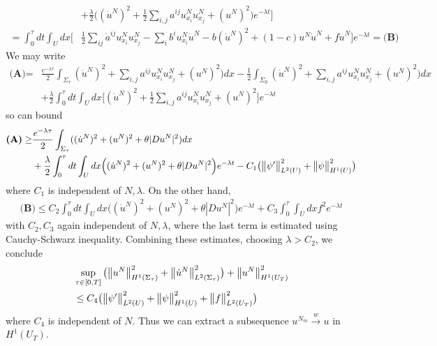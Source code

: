 \documentclass[12pt,a4paper]{report}
\newenvironment{proof}
{\begin{changemargin}{1cm}{0.5cm} 
	}%
	{\end{changemargin}
}
\begin{document}
\begin{proof}
\begin{align*}
&+ \frac{\lambda}{2} \Big( (\dot{u}^N)^2 + \frac{1}{2} \sum_{i,j}a^{ij}u^N_{x_i}u^N_{x_j} + (u^N)^2 \Big)e^{-\lambda t} \bigg] \\
= \int_0^{\tau}dt \int_U dx \Big[ &\frac{1}{2} \sum_{ij} \dot{a}^{ij} u_{x_i}^N u_{x_j}^N - \sum_i b^i u_{x_i}^N \dot{u}^N - b(\dot{u}^N)^2 + (1-c)u^N \dot{u}^N + f\dot{u}^N \Big]e^{-\lambda t} = \textbf{(B)}
\end{align*}
We may write
\begin{align*}
\textbf{(A)} =& \frac{e^{-\lambda \tau}}{2} \int_{\Sigma_{\tau}} ( \dot{u}^N)^2 + \sum_{i,j} a^{ij} u^N_{x_i} u^N_{x_j} +(u^N)^2 )dx - \frac{1}{2} \int_{\Sigma_{0}} ( \dot{u}^N)^2 + \sum_{i,j} a^{ij} u^N_{x_i} u^N_{x_j} +(u^N)^2 )dx \\
&+ \frac{\lambda}{2} \int_0^{\tau} dt \int_U dx \Big[ (\dot{u}^N)^2 + \frac{1}{2} \sum_{i,j}a^{ij}u_{x_i}^N u_{x_j}^N + (u^N)^2 \Big] e^{-\lambda t}
\end{align*}
so can bound
\begin{align*}
\textbf{(A)} \geq & \frac{e^{-\lambda \tau}}{2} \int_{\Sigma_{\tau}} ( ( \dot{u}^N)^2 + (u^N)^2 + \theta |Du^N|^2  ) dx \\
&+ \frac{\lambda}{2} \int_0^{\tau} dt \int_U dx \Big( (\dot{u}^N)^2 + (u^N)^2 + \theta |Du^N|^2 \Big) e^{-\lambda t} - C_1 \big( \bigl\lVert\psi'\bigr\rVert_{L^2(U)}^2 + \bigl\lVert\psi\bigr\rVert_{H^1(U)}^2 \big)
\end{align*}
where $C_1$ is independent of $N, \lambda$. On the other hand,
\begin{align*}
\textbf{(B)} \leq C_2 \int_0^{\tau} dt \int_U dx \Big( (\dot{u}^N)^2 + (u^N)^2 + \theta |Du^N|^2 \Big) e^{-\lambda t} + C_3 \int_0^{\tau} \int_U dx f^2 e^{-\lambda t} 
\end{align*}
with $C_2, C_3$ again independent of $N, \lambda$, where the last term is estimated using Cauchy-Schwarz inequality. Combining these estimates, choosing $\lambda > C_2$, we conclude
\begin{align*}
&\sup_{\tau \in [0,T]} \big( \bigl\lVert u^N\bigr\rVert_{H^1(\Sigma_{\tau})}^2 + \bigl\lVert\dot{u}^N\bigr\rVert_{L^2(\Sigma_{\tau})}^2 \big) + \bigl\lVert u^N\bigr\rVert_{H^1(U_T)}^2  \\
& \leq C_4 \big( \bigl\lVert\psi'\bigr\rVert_{L^2(U)}^2 + \bigl\lVert\psi\bigr\rVert_{H^1(U)}^2 + \bigl\lVert f\bigr\rVert_{L^2(U_T)}^2 \big)
\end{align*}
where $C_4$ is independent of $N$. Thus we can extract a subsequence $u^{N_m} \xrightarrow{w} u$ in $H^1(U_T)$.


\end{proof}
\end{document}
